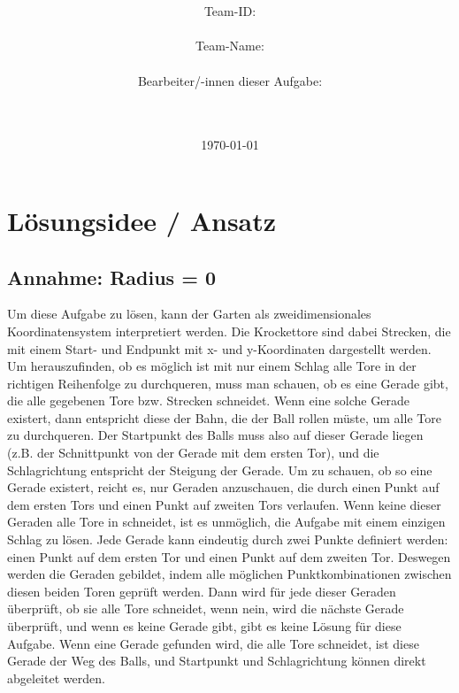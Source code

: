 \documentclass[a4paper,10pt,ngerman]{scrartcl}
\title{\textbf{\Huge\Aufgabe}}
\author{\LARGE Team-ID: \LARGE \TeamId \\\\
	    \LARGE Team-Name: \LARGE \TeamName \\\\
	    \LARGE Bearbeiter/-innen dieser Aufgabe: \\ 
	    \LARGE \Namen\\\\}
\date{\LARGE\today}
\begin{document}
\maketitle
\tableofcontents

\vspace{0.5cm}

\section{Lösungsidee / Ansatz}
\subsection{Annahme: Radius = 0}
Um diese Aufgabe zu lösen, kann der Garten als zweidimensionales Koordinatensystem interpretiert werden. Die Krockettore sind dabei Strecken, die mit einem Start- und Endpunkt mit x- und y-Koordinaten dargestellt werden.
Um herauszufinden, ob es möglich ist mit nur einem Schlag alle Tore in der richtigen Reihenfolge zu durchqueren, muss man schauen, ob es eine Gerade gibt, die alle gegebenen Tore bzw. Strecken schneidet.
Wenn eine solche Gerade existert, dann entspricht diese der Bahn, die der Ball rollen müste, um alle Tore zu durchqueren. Der Startpunkt des Balls muss also auf dieser Gerade liegen (z.B. der Schnittpunkt von der Gerade mit dem ersten Tor), und die Schlagrichtung entspricht 
der Steigung der Gerade. 
\newline
Um zu schauen, ob so eine Gerade existert, reicht es, nur Geraden anzuschauen, die durch einen Punkt auf dem ersten Tors und einen Punkt auf zweiten Tors verlaufen. Wenn keine dieser Geraden alle Tore in schneidet, ist es unmöglich, die Aufgabe mit einem einzigen Schlag zu lösen.
Jede Gerade kann eindeutig durch zwei Punkte definiert werden: einen Punkt auf dem ersten Tor und einen Punkt auf dem zweiten Tor. Deswegen werden die Geraden gebildet, indem alle möglichen Punktkombinationen zwischen diesen beiden Toren geprüft werden.
\newline
Dann wird für jede dieser Geraden überprüft, ob sie alle Tore schneidet, wenn nein, wird die nächste Gerade überprüft, und wenn es keine Gerade gibt, gibt es keine Lösung für diese Aufgabe. Wenn eine Gerade gefunden wird, die alle Tore schneidet,
ist diese Gerade der Weg des Balls, und Startpunkt und Schlagrichtung können direkt abgeleitet werden.
\end{document}
